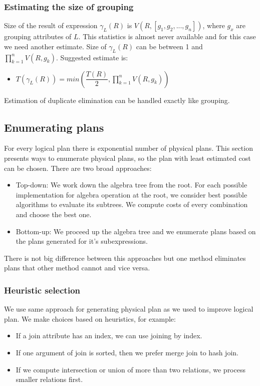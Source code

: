 \subsubsection{Estimating the size of grouping}
Size of the result of expression $\gamma_L(R)$ is $V(R,[g_1,g_2,...,g_n])$, where $g_x$ are grouping attributes of $L$. This statistics is almost never available and for this case we need another estimate. Size of $\gamma_L(R)$ can be between 1 and $\prod_{k=1}^{n}{V(R,g_k)}$. Suggested estimate is:
\begin{itemize}
\item $T(\gamma_L(R))=min(\dfrac{T(R)}{2},\prod_{k=1}^{n}{V(R,g_k)})$
\end{itemize}
Estimation of duplicate elimination can be handled exactly like grouping.

\subsection{Enumerating plans}
For every logical plan there is exponential number of physical plans. This section presents ways to enumerate physical plans, so the plan with least estimated cost can be chosen. There are two broad approaches:
\begin{itemize}
\item Top-down: We work down the algebra tree from the root. For each possible implementation for algebra operation at the root, we consider best possible algorithms to evaluate its subtrees. We compute costs of every combination and choose the best one.
\item Bottom-up: We proceed up the algebra tree and we enumerate plans based on the plans generated for it's subexpressions.
\end{itemize}

There is not big difference between this approaches but one method eliminates plans that other method cannot and vice versa.
\subsubsection{Heuristic selection}

We use same approach for generating physical plan as we used to improve logical plan. We make choices based on heuristics, for example:

\begin{itemize}

\item If a join attribute has an index, we can use joining by index.
\item If one argument of join is sorted, then we prefer merge join to hash join.
\item If we compute intersection or union of more than two relations, we process smaller relations first.
\end{itemize}

